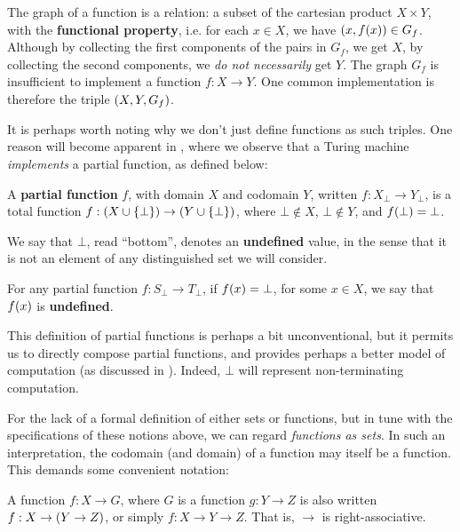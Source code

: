 The graph of a function is a relation: a subset of the cartesian product
$X\times Y$, with the \textbf{functional property}, i.e. for each $x\in X$, we
have $\mathopen{}\left({x,f\mathopen{}\left({x}\right)\mathclose{}}\right)\mathclose{} \in G_f$. Although by collecting the first components of the
pairs in $G_f$, we get $X$, by collecting the second components, we \emph{do
not necessarily} get $Y$. The graph $G_f$ is insufficient to implement a
function $f:X\rightarrow Y$. One common implementation is therefore the triple
$\mathopen{}\left({X,Y,G_f}\right)\mathclose{}$.

It is perhaps worth noting why we don't just define functions as such triples.
One reason will become apparent in ,
where we observe that a Turing machine \emph{implements} a partial function, as
defined below:

\begin{definition} A \textbf{partial function} $f$, with domain $X$ and
codomain $Y$, written $f:X_\bot\rightarrow Y_\bot$, is a total function $f :
\mathopen{}\left({X\cup\mathopen{}\left\{{\bot}\right\}\mathclose{}}\right)\mathclose{} \rightarrow \mathopen{}\left({Y\cup\mathopen{}\left\{{\bot}\right\}\mathclose{}}\right)\mathclose{}$, where $\bot\notin X$,
$\bot\notin Y$, and $f\mathopen{}\left({\bot}\right)\mathclose{}=\bot$.\end{definition}

\begin{definition} We say that $\bot$, read ``bottom'', denotes an
\textbf{undefined} value, in the sense that it is not an element of any
distinguished set we will consider. \end{definition}

\begin{definition} For any partial function $f:S_\bot\rightarrow T_\bot$, if
$f\mathopen{}\left({x}\right)\mathclose{}=\bot$, for some $x\in X$, we say that $f\mathopen{}\left({x}\right)\mathclose{}$ is
\textbf{undefined}.\end{definition}

This definition of partial functions is perhaps a bit unconventional, but it
permits us to directly compose partial functions, and provides perhaps a better
model of computation (as discussed in
). Indeed, $\bot$ will represent
non-terminating computation.

For the lack of a formal definition of either sets or functions, but in tune
with the specifications of these notions above, we can regard \emph{functions
as sets}. In such an interpretation, the codomain (and domain) of a function
may itself be a function. This demands some convenient notation:

\begin{notation} A function $f:X\rightarrow G$, where $G$ is a function
$g:Y\rightarrow Z$ is also written $f:X\rightarrow \mathopen{}\left({Y\rightarrow Z}\right)\mathclose{}$, or
simply $f:X\rightarrow Y\rightarrow Z$. That is, $\rightarrow$ is
right-associative. \end{notation}

